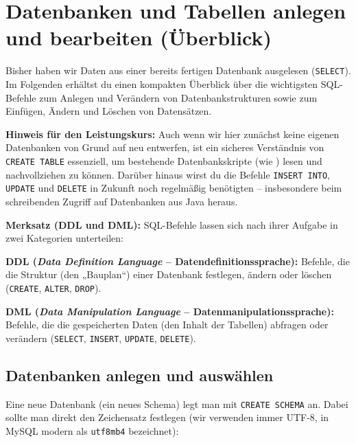 \section{Datenbanken und Tabellen anlegen und bearbeiten (Überblick) \tagLK}

Bisher haben wir Daten aus einer bereits fertigen Datenbank ausgelesen
(\lstinline|SELECT|). Im Folgenden erhältst du einen kompakten Überblick über
die wichtigsten SQL-Befehle zum Anlegen und Verändern von Datenbankstrukturen
sowie zum Einfügen, Ändern und Löschen von Datensätzen.

\noindent \textbf{Hinweis für den Leistungskurs:} Auch wenn wir hier zunächst
keine eigenen Datenbanken von Grund auf neu entwerfen, ist ein sicheres
Verständnis von \lstinline|CREATE TABLE| essenziell, um bestehende
Datenbankskripte (wie ) lesen und nachvollziehen zu
können. Darüber hinaus wirst du die Befehle \lstinline|INSERT INTO|,
\lstinline|UPDATE| und \lstinline|DELETE| in Zukunft noch regelmäßig benötigten
-- insbesondere beim schreibenden Zugriff auf Datenbanken aus Java heraus.

\begin{framed}
\textbf{Merksatz (DDL und DML):} SQL-Befehle lassen sich nach ihrer Aufgabe in
zwei Kategorien unterteilen:
\begin{compactitem}
  \item \textbf{DDL (\emph{Data Definition Language} -- Datendefinitionssprache):}
  Befehle, die die Struktur (den „Bauplan“) einer Datenbank festlegen, ändern
  oder löschen (\lstinline|CREATE|, \lstinline|ALTER|, \lstinline|DROP|).
  \item \textbf{DML (\emph{Data Manipulation Language} -- Datenmanipulationssprache):}
  Befehle, die die gespeicherten Daten (den Inhalt der Tabellen) abfragen oder
  verändern (\lstinline|SELECT|, \lstinline|INSERT|, \lstinline|UPDATE|,
  \lstinline|DELETE|).
\end{compactitem}
\end{framed}

\subsection{Datenbanken anlegen und auswählen}

Eine neue Datenbank (ein neues Schema) legt man mit \lstinline|CREATE SCHEMA|
an. Dabei sollte man direkt den Zeichensatz festlegen (wir verwenden immer
UTF-8, in MySQL modern als \lstinline|utf8mb4| bezeichnet):

